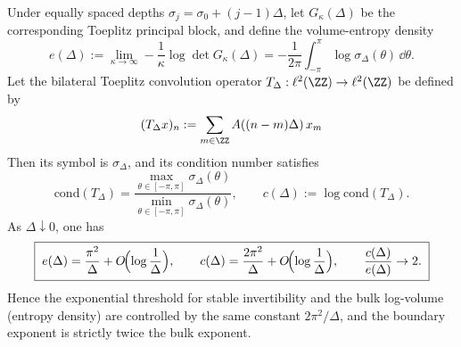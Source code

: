 ﻿%
%

\begin{corollary}\label{cor:xi-hellinger-toeplitz-dense-2x-law}
Under equally spaced depths \(\sigma_j=\sigma_0+(j-1)\Delta\), let \(G_\kappa(\Delta)\) be the corresponding Toeplitz principal block, and define the volume-entropy density
\[
e(\Delta):=\lim_{\kappa\to\infty}-\frac1\kappa\log\det G_\kappa(\Delta)
=-\frac{1}{2\pi}\int_{-\pi}^{\pi}\log\sigma_\Delta(\theta)\,\dd\theta.
\]
Let the bilateral Toeplitz convolution operator \(T_\Delta:\ell^2(\ZZ)\to\ell^2(\ZZ)\) be defined by
\[
(T_\Delta x)_n:=\sum_{m\in\ZZ}A((n-m)\Delta)\,x_m
\]
Then its symbol is \(\sigma_\Delta\), and its condition number satisfies
\[
\mathrm{cond}(T_\Delta)=\frac{\max_{\theta\in[-\pi,\pi]}\sigma_\Delta(\theta)}{\min_{\theta\in[-\pi,\pi]}\sigma_\Delta(\theta)},
\qquad
c(\Delta):=\log\mathrm{cond}(T_\Delta).
\]
As \(\Delta\downarrow0\), one has
\[
\boxed{\;
e(\Delta)=\frac{\pi^2}{\Delta}+O\!\Bigl(\log\frac1\Delta\Bigr),\qquad
c(\Delta)=\frac{2\pi^2}{\Delta}+O\!\Bigl(\log\frac1\Delta\Bigr),\qquad
\frac{c(\Delta)}{e(\Delta)}\to 2.\;}
\]
Hence the exponential threshold for stable invertibility and the bulk log-volume (entropy density) are controlled by the same constant \(2\pi^2/\Delta\), and the boundary exponent is strictly twice the bulk exponent.
\end{corollary}
